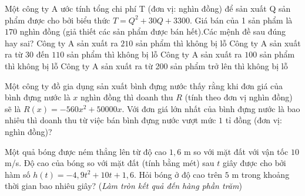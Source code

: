 \begin{ex}%
	Một công ty A ước tính tổng chi phí T (đơn vị: nghìn đồng) để sản xuất Q sản phẩm được cho bởi biểu thức $T=Q^2+30Q+3300$. Giá bán của 1 sản phẩm là $170$ nghìn đồng (giả thiết các sản phẩm được bán hết).Các mệnh đề sau đúng hay sai?
	\choiceTF
	{Công ty A sản xuất ra $210$ sản phẩm thì không bị lỗ}
	{\True Công ty A sản xuất ra từ $30$ đến $110$ sản phẩm thì không bị lỗ}
	{\True Công ty A sản xuất ra $100$ sản phẩm thì không bị lỗ}
	{Công ty A sản xuất ra từ 200 sản phẩm trở lên thì không bị lỗ}
\end{ex}


\begin{bt}%
	Một công ty đồ gia dụng sản xuất bình đựng nước thấy rằng khi đơn giá của bình đựng nước là $x$ nghìn đồng thì doanh thu $R$ (tính theo đơn vị nghìn đồng) sẽ là $R(x)=-560x^2+50000x$.
	Với đơn giá lớn nhất của bình đựng nước là bao nhiêu thì doanh thu từ việc bán bình đựng nước vượt mức $1$ tỉ đồng (đơn vị: nghìn đồng)?	
\end{bt}

\begin{bt}%
	Một quả bóng được ném thẳng lên từ độ cao $1{,}6$ m so với mặt đất với vận tốc $10$ m/s. Độ cao của bóng so với mặt đất (tính bằng mét) sau $t$ giây được cho bởi hàm số $h(t)=-4{,}9t^2+10t+1{,}6$. Hỏi bóng ở độ cao trên $5$ m trong khoảng thời gian bao nhiêu giây? (\textit{Làm tròn kết quả đến hàng phần trăm})
\end{bt}

